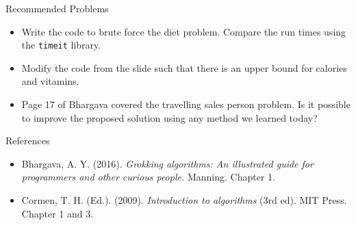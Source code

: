 \documentclass[
  ignorenonframetext,
]{beamer}
\begin{document}
\begin{frame}[fragile]{Recommended Problems}
\protect\hypertarget{recommended-problems}{}
\begin{itemize}
\item
  Write the code to brute force the diet problem. Compare the run times
  using the \texttt{timeit} library.
\item
  Modify the code from the slide such that there is an upper bound for
  calories and vitamins.
\item
  Page 17 of Bhargava covered the travelling sales person problem. Is it
  possible to improve the proposed solution using any method we learned
  today?
\end{itemize}
\end{frame}

\begin{frame}{References}
\protect\hypertarget{references}{}
\begin{itemize}
\item
  Bhargava, A. Y. (2016). \emph{Grokking algorithms: An illustrated
  guide for programmers and other curious people.} Manning. Chapter 1.
\item
  Cormen, T. H. (Ed.). (2009). \emph{Introduction to algorithms} (3rd
  ed). MIT Press. Chapter 1 and 3.
\end{itemize}
\end{frame}
\end{document}
